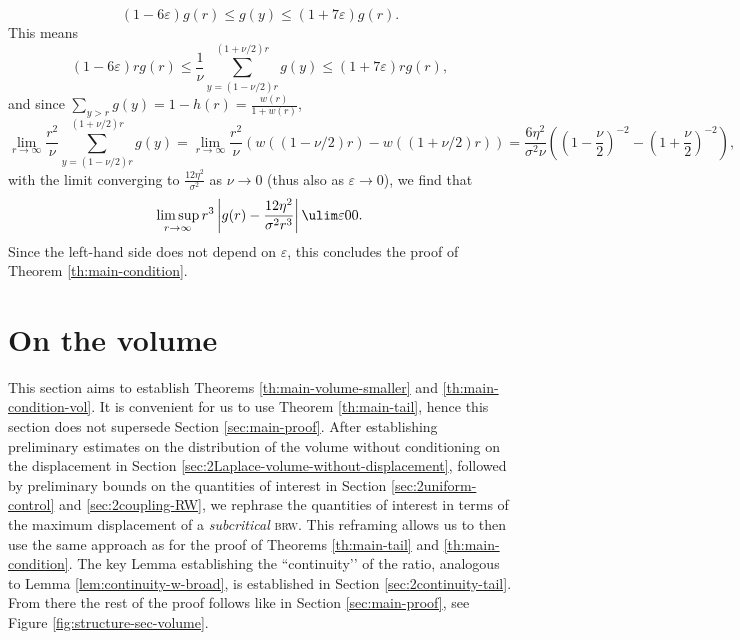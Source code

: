 \documentclass[10pt,a4paper]{article}
\newcommand{\brw}{\textsc{brw}\xspace}
\begin{document}
\[ (1-6\varepsilon) g(r) \leq g(y) \leq (1+7\varepsilon) g(r) . \]
This means
\[ (1-6\varepsilon) r g(r) \leq \frac{1}{\nu} \sum_{y=(1-\nu/2)r}^{(1+\nu/2) r} g(y) \leq (1+7\varepsilon) r g(r) , \]
and since $\sum_{y>r} g(y) = 1-h(r) = \frac{w(r)}{1+w(r)}$, 
\[ \lim_{r\to\infty} \frac{r^2}{\nu} \sum_{y=(1-\nu/2)r}^{(1+\nu/2) r} g(y) = \lim_{r\to\infty} \frac{r^2}{\nu} (w((1-\nu/2)r) - w((1+\nu/2)r)) = \frac{6 \eta^2}{\sigma^2 \nu}\left( \left(1-\frac{\nu}{2}\right)^{-2} - \left(1+\frac{\nu}{2}\right)^{-2} \right) , \]
with the limit converging to $\frac{12 \eta^2}{\sigma^2}$ as $\nu\to 0$ (thus also as $\varepsilon\to 0$), 
we find that 
\[ \limsup_{r\to\infty} r^3 \left| g(r) - \frac{12 \eta^2}{\sigma^2 r^3} \right| \ulim \varepsilon 0 0 . \]
Since the left-hand side does not depend on $\varepsilon$, this concludes the proof of Theorem \ref{th:main-condition}. 













\section{On the volume}
\label{sec:2Volume-general}

This section aims to establish Theorems \ref{th:main-volume-smaller} and \ref{th:main-condition-vol}. It is convenient for us to use Theorem \ref{th:main-tail}, hence this section does not supersede Section \ref{sec:main-proof}. After establishing preliminary estimates on the distribution of the volume without conditioning on the displacement in Section \ref{sec:2Laplace-volume-without-displacement}, followed by preliminary bounds on the quantities of interest in Section \ref{sec:2uniform-control} and \ref{sec:2coupling-RW}, we rephrase the quantities of interest in terms of the maximum displacement of a \emph{subcritical} \brw. This reframing allows us to then use the same approach as for the proof of Theorems \ref{th:main-tail} and \ref{th:main-condition}. The key Lemma establishing the ``continuity’’ of the ratio, analogous to Lemma \ref{lem:continuity-w-broad}, is established in Section \ref{sec:2continuity-tail}. From there the rest of the proof follows like in Section \ref{sec:main-proof}, see Figure \ref{fig:structure-sec-volume}. 
\end{document}
